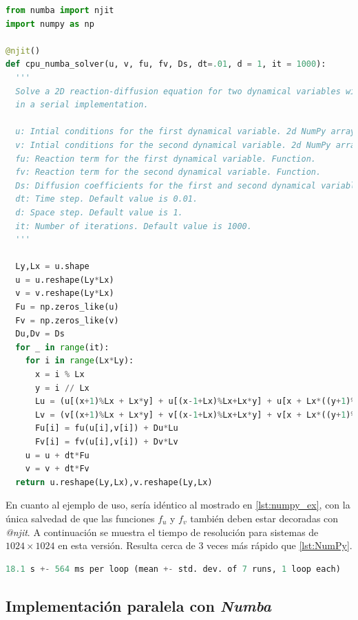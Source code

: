 \begin{lstlisting}[language=Python,caption = Implementación serial con \textit{Numba}.,label = {lst:numba}]
from numba import njit
import numpy as np

@njit()
def cpu_numba_solver(u, v, fu, fv, Ds, dt=.01, d = 1, it = 1000):
  '''
  Solve a 2D reaction-diffusion equation for two dynamical variables with periodic boundary conditions using Numba 
  in a serial implementation.

  u: Intial conditions for the first dynamical variable. 2d NumPy array of shape (Ly,Lx).
  v: Intial conditions for the second dynamical variable. 2d NumPy array of shape (Ly,Lx).
  fu: Reaction term for the first dynamical variable. Function.
  fv: Reaction term for the second dynamical variable. Function.
  Ds: Diffusion coefficients for the first and second dynamical variables. List or array of length 2.
  dt: Time step. Default value is 0.01.
  d: Space step. Default value is 1.
  it: Number of iterations. Default value is 1000.
  '''    

  Ly,Lx = u.shape
  u = u.reshape(Ly*Lx)
  v = v.reshape(Ly*Lx)
  Fu = np.zeros_like(u)
  Fv = np.zeros_like(v)
  Du,Dv = Ds
  for _ in range(it):
    for i in range(Lx*Ly):
      x = i % Lx
      y = i // Lx
      Lu = (u[(x+1)%Lx + Lx*y] + u[(x-1+Lx)%Lx+Lx*y] + u[x + Lx*((y+1)%Ly)] + u[x + Lx*((y-1+Ly)%Ly)] - 4*u[i])/d**2
      Lv = (v[(x+1)%Lx + Lx*y] + v[(x-1+Lx)%Lx+Lx*y] + v[x + Lx*((y+1)%Ly)] + v[x + Lx*((y-1+Ly)%Ly)] - 4*v[i])/d**2
      Fu[i] = fu(u[i],v[i]) + Du*Lu 
      Fv[i] = fv(u[i],v[i]) + Dv*Lv
    u = u + dt*Fu
    v = v + dt*Fv
  return u.reshape(Ly,Lx),v.reshape(Ly,Lx) 
\end{lstlisting}

En cuanto al ejemplo de uso, sería idéntico al mostrado en \ref{lst:numpy_ex}, con la única salvedad de que las funciones $f_u$ y $f_v$ también deben estar decoradas 
con \textit{@njit}. A continuación se muestra el tiempo de resolución para sistemas de $1024\times1024$ en esta versión. Resulta cerca de 3 veces más rápido 
que \ref{lst:NumPy}.

\begin{lstlisting}[language=Python,label = {lst:numba_re}]
%timeit cpu_numba_solver(u,v,fu,fv,Ds)
18.1 s +- 564 ms per loop (mean +- std. dev. of 7 runs, 1 loop each)
\end{lstlisting}

\subsection{Implementación paralela con \textit{Numba}}


